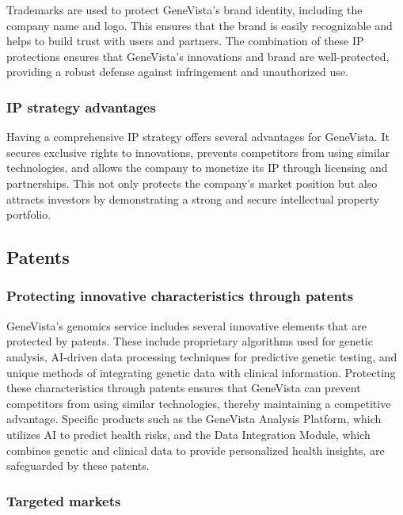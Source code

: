 \documentclass[a4paper]{article}
\begin{document}
Trademarks are used to protect GeneVista’s brand identity, including the company name and logo. This ensures that the brand is easily recognizable and helps to build trust with users and partners. The combination of these IP protections ensures that GeneVista’s innovations and brand are well-protected, providing a robust defense against infringement and unauthorized use.

\subsubsection{IP strategy advantages}

Having a comprehensive IP strategy offers several advantages for GeneVista. It secures exclusive rights to innovations, prevents competitors from using similar technologies, and allows the company to monetize its IP through licensing and partnerships. This not only protects the company’s market position but also attracts investors by demonstrating a strong and secure intellectual property portfolio.

\subsection{Patents}

\subsubsection{Protecting innovative characteristics through patents}

GeneVista’s genomics service includes several innovative elements that are protected by patents. These include proprietary algorithms used for genetic analysis, AI-driven data processing techniques for predictive genetic testing, and unique methods of integrating genetic data with clinical information. Protecting these characteristics through patents ensures that GeneVista can prevent competitors from using similar technologies, thereby maintaining a competitive advantage. Specific products such as the GeneVista Analysis Platform, which utilizes AI to predict health risks, and the Data Integration Module, which combines genetic and clinical data to provide personalized health insights, are safeguarded by these patents.

\subsubsection{Targeted markets}
\end{document}
